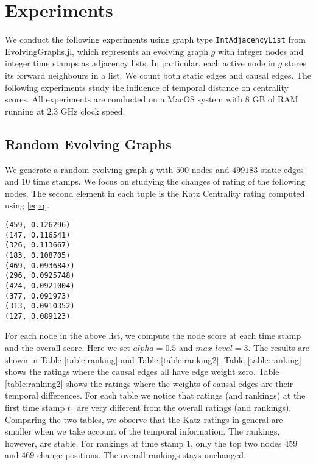 \documentclass[12pt]{article}
\theoremstyle{definition}
\begin{document}
\section{Experiments}
\label{sec:experiments}

We conduct the following experiments using graph type \texttt{IntAdjacencyList} from EvolvingGraphs.jl, which represents an evolving graph $g$ with integer nodes and integer time stamps as adjacency lists. In particular, each active node in $g$ stores its forward neighbours in a list. We count both static edges and causal edges.
The following experiments study the influence of temporal distance on centrality scores. All experiments are conducted on a MacOS system with $8$ GB of RAM running at $2.3$ GHz clock speed.

\subsection{Random Evolving Graphs}
\label{sec:random}

We generate a random evolving graph $g$ with $500$ nodes and $499183$ static edges and $10$ time stamps.
We focus on studying the changes of rating of the following nodes.
The second element in each tuple is the Katz Centrality rating computed using \eqref{eq:q}.
\begin{lstlisting}
(459, 0.126296)
(147, 0.116541)
(326, 0.113667)
(183, 0.108705)
(469, 0.0936847)
(296, 0.0925748)
(424, 0.0921004)
(377, 0.091973)
(313, 0.0910352)
(127, 0.089123)
\end{lstlisting}
For each node in the above list,
we compute the node score at each time stamp and the overall score.
Here we set $alpha = 0.5$  and $max\_level = 3$.  The results are shown in Table \ref{table:ranking} and Table \ref{table:ranking2}.
Table \ref{table:ranking} shows the ratings where the causal edges
all have edge weight zero. Table \ref{table:ranking2} shows the ratings where the weights of causal edges are their temporal differences.
For each table we notice that ratings (and rankings) at the first time stamp $t_1$ are very different from the overall ratings (and rankings).
Comparing the two tables, we observe that the Katz ratings in general are smaller when we take account of the temporal information. The rankings, however, are stable. For rankings at time stamp $1$, only the top two nodes $459$ and $469$ change positions. The overall rankings stays unchanged.
\end{document}
